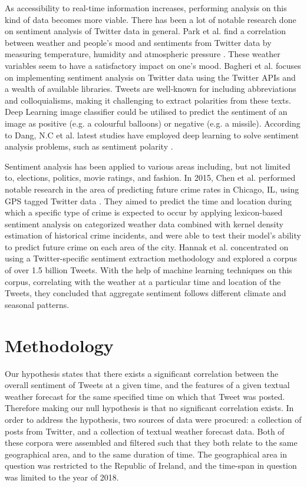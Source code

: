 \documentclass[a4paper,10pt]{article}
\begin{document}
    As accessibility to real-time information increases, performing analysis on this kind of data becomes more viable. There has been a lot of notable research done on sentiment analysis of Twitter data in general. Park et al. find a correlation between weather and people’s mood and sentiments from Twitter data by measuring temperature, humidity and atmospheric pressure . These weather variables seem to have a satisfactory impact on one’s mood. Bagheri et al.  focuses on implementing sentiment analysis on Twitter data using the Twitter APIs and a wealth of available libraries. Tweets are well-known for including abbreviations and colloquialisms, making it challenging to extract polarities from these texts. Deep Learning image classifier could be utilised to predict the sentiment of an image as positive (e.g. a colourful balloons) or negative (e.g. a missile). According to Dang, N.C et al. latest studies have employed deep learning to solve sentiment analysis problems, such as sentiment polarity \cite{dang2020sentiment}.
    
    Sentiment analysis has been applied to various areas including, but not limited to, elections, politics, movie ratings, and fashion. In 2015, Chen et al. performed notable research in the area of predicting future crime rates in Chicago, IL, using GPS tagged Twitter data . They aimed to predict the time and location during which a specific type of crime is expected to occur by applying lexicon-based sentiment analysis on categorized weather data combined with kernel density estimation of historical crime incidents, and were able to test their model's ability to predict future crime on each area of the city. Hannak et al.  concentrated on using a Twitter-specific sentiment extraction methodology and explored a corpus of over 1.5 billion Tweets. With the help of machine learning techniques on this corpus, correlating with the weather at a particular time and location of the Tweets, they concluded that aggregate sentiment follows different climate and seasonal patterns.

    \section{Methodology}
    \label{methodology}

    Our hypothesis states that there exists a significant correlation between the overall sentiment of Tweets at a given time, and the features of a given textual weather forecast for the same specified time on which that Tweet was posted. Therefore making our null hypothesis is that no significant correlation exists. In order to address the hypothesis, two sources of data were procured: a collection of posts from Twitter, and a collection of textual weather forecast data. Both of these corpora were assembled and filtered such that they both relate to the same geographical area, and to the same duration of time. The geographical area in question was restricted to the Republic of Ireland, and the time-span in question was limited to the year of 2018. 
\end{document}
